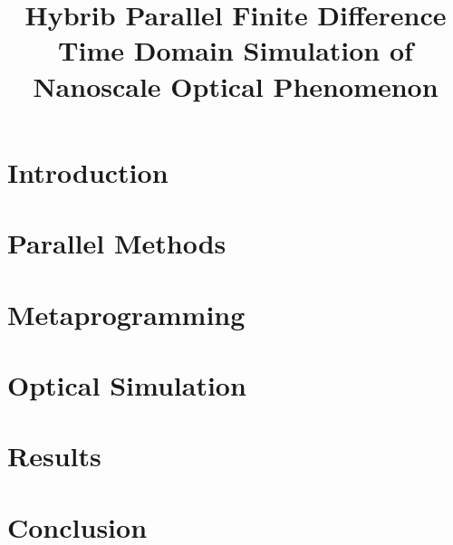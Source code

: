\documentclass[11pt, conference, draftcls, letterpaper]{IEEEtran}
\begin{document}
\title{Hybrib Parallel Finite Difference Time Domain Simulation of
  Nanoscale Optical Phenomenon}
\author{ 
}

\maketitle

\begin{abstract}
  
\end{abstract}


\section{Introduction}


\section{Parallel Methods}

\section{Metaprogramming}

\section{Optical Simulation}

\section{Results}

\section{Conclusion}




\end{document}
